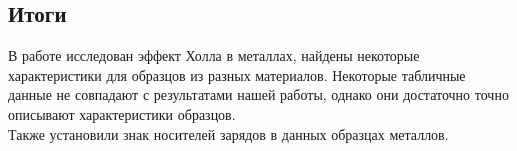 \documentclass{lab}
\begin{document}
\subsection*{Итоги}

В работе исследован эффект Холла в металлах, найдены некоторые характеристики для образцов из разных материалов. Некоторые табличные данные не совпадают с результатами нашей работы, однако они достаточно точно описывают характеристики образцов.\\
Также установили знак носителей зарядов в данных образцах металлов.
\end{document}
